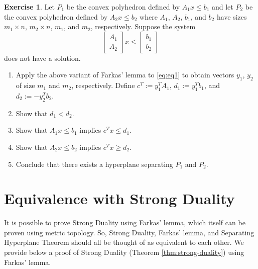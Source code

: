 \documentclass[
]{book}
\providecommand{\tightlist}{%
  \setlength{\itemsep}{0pt}\setlength{\parskip}{0pt}}
\theoremstyle{definition}
\theoremstyle{definition}
\theoremstyle{definition}
\newtheorem{exercise}{Exercise}[chapter]
\theoremstyle{definition}
\theoremstyle{remark}
\begin{document}
\begin{exercise}

Let \(P_1\) be the convex polyhedron defined by \(A_1 x \le b_1\) and let \(P_2\) be the convex polyhedron defined by \(A_2 x \le b_2\) where \(A_1\), \(A_2\), \(b_1\), and \(b_2\) have sizes \(m_1 \times n\), \(m_2 \times n\), \(m_1\), and \(m_2\), respectively. Suppose the system
\begin{equation}
  \begin{bmatrix} A_1 \\ A_2 \end{bmatrix}
  x 
  \le
  \begin{bmatrix} b_1 \\ b_2 \end{bmatrix}
  \label{eq:eq1}
\end{equation}
does not have a solution.

\begin{enumerate}
\def\labelenumi{\arabic{enumi}.}
\tightlist
\item
  Apply the above variant of Farkas' lemma to \eqref{eq:eq1} to obtain vectors \(y_1\), \(y_2\) of size \(m_1\) and \(m_2\), respectively. Define \(c^T := y_1^T A_1\), \(d_1 := y_1^T b_1\), and \(d_2 := -y_2^T b_2\).
\item
  Show that \(d_1 < d_2\).
\item
  Show that \(A_1 x \le b_1\) implies \(c^T x \le d_1\).
\item
  Show that \(A_2 x \le b_2\) implies \(c^T x \ge d_2\).
\item
  Conclude that there exists a hyperplane separating \(P_1\) and \(P_2\).
\end{enumerate}

\end{exercise}

\hypertarget{equivalence-with-strong-duality}{%
\section{Equivalence with Strong Duality}\label{equivalence-with-strong-duality}}

It is possible to prove Strong Duality using Farkas' lemma, which itself can be proven using metric topology. So, Strong Duality, Farkas' lemma, and Separating Hyperplane Theorem should all be thought of as equivalent to each other. We provide below a proof of Strong Duality (Theorem \ref{thm:strong-duality}) using Farkas' lemma.
\end{document}
